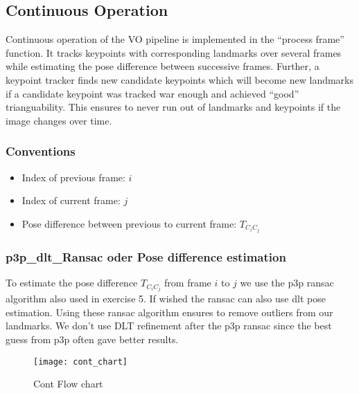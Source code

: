 \subsection{Continuous Operation}
\label{sec_cont_op}
Continuous operation of the VO pipeline is implemented in the ``process frame'' function. It tracks keypoints with corresponding landmarks over several frames while estimating the pose difference between successive frames. Further, a keypoint tracker finds new candidate keypoints which will become new landmarks if a candidate keypoint was tracked war enough and achieved ``good'' trianguability. This ensures to never run out of landmarks and keypoints if the image changes over time.

\subsubsection{Conventions}
\begin{itemize}
	\item Index of previous frame: $i$
	\item Index of current frame: $j$
	\item Pose difference between previous to current frame: $T_{C_iC_j}$
\end{itemize}

\subsubsection{p3p\_dlt\_Ransac oder Pose difference estimation}
To estimate the pose difference $T_{C_iC_j}$ from frame $i$ to $j$ we use the p3p ransac algorithm also used in exercise 5. If wished the ransac can also use dlt pose estimation. Using these ransac algorithm ensures to remove outliers from our landmarks. We don't use DLT refinement after the p3p ransac since the best guess from p3p often gave better results.




\begin{figure}[ht]
	\centering
	\texttt{[image: cont\_chart]}
	\caption{Cont Flow chart}
	\label{img_flow_cont}
\end{figure}